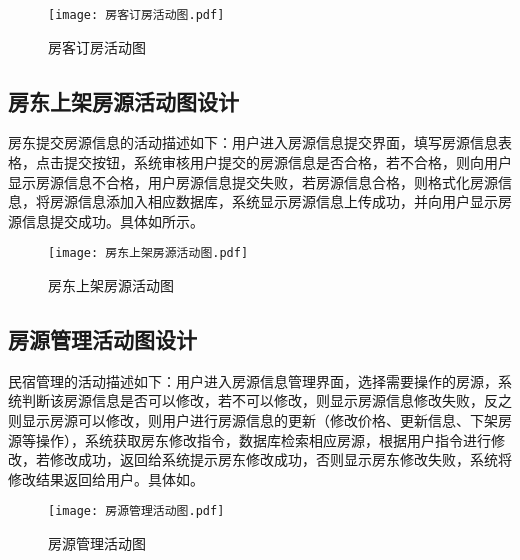 \documentclass[lang=cn,11pt,a4paper,cite=authoryear]{elegantpaper}
\begin{document}
\begin{figure}[]
    \centering
    \texttt{[image: 房客订房活动图.pdf]}
    \caption{房客订房活动图}
    \label{fig:房客订房活动图}
\end{figure}

\subsection{房东上架房源活动图设计}

房东提交房源信息的活动描述如下：用户进入房源信息提交界面，填写房源信息表格，点击提交按钮，系统审核用户提交的房源信息是否合格，若不合格，则向用户显示房源信息不合格，用户房源信息提交失败，若房源信息合格，则格式化房源信息，将房源信息添加入相应数据库，系统显示房源信息上传成功，并向用户显示房源信息提交成功。具体如所示。

\begin{figure}[]
    \centering
    \texttt{[image: 房东上架房源活动图.pdf]}
    \caption{房东上架房源活动图}
    \label{fig:房东上架房源活动图}
\end{figure}

\subsection{房源管理活动图设计}

民宿管理的活动描述如下：用户进入房源信息管理界面，选择需要操作的房源，系统判断该房源信息是否可以修改，若不可以修改，则显示房源信息修改失败，反之则显示房源可以修改，则用户进行房源信息的更新（修改价格、更新信息、下架房源等操作），系统获取房东修改指令，数据库检索相应房源，根据用户指令进行修改，若修改成功，返回给系统提示房东修改成功，否则显示房东修改失败，系统将修改结果返回给用户。具体如。

\begin{figure}[]
    \centering
    \texttt{[image: 房源管理活动图.pdf]}
    \caption{房源管理活动图}
    \label{fig:房源管理活动图}
\end{figure}
\end{document}
